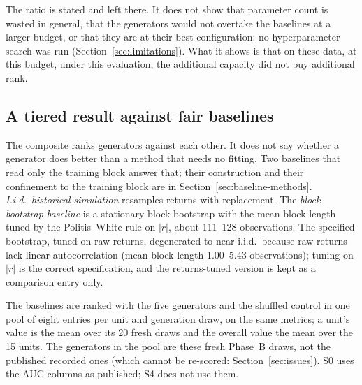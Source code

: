 \documentclass[11pt,a4paper]{article}
\makeatletter
\DeclareRobustCommand{\_}{\ifmmode\nfss@text{\textunderscore}\else\textunderscore\allowbreak\fi}
\makeatother
\begin{document}
The ratio is stated and left there. It does not show that parameter count is wasted in general, that the generators would not overtake the baselines at a larger budget, or that they are at their best configuration: no hyperparameter search was run (Section~\ref{sec:limitations}). What it shows is that on these data, at this budget, under this evaluation, the additional capacity did not buy additional rank.

\subsection{A tiered result against fair baselines}
\label{sec:tiers}
The composite ranks generators against each other. It does not say whether a generator does better than a method that needs no fitting. Two baselines that read only the training block answer that; their construction and their confinement to the training block are in Section~\ref{sec:baseline-methods}. \emph{I.i.d.\ historical simulation} resamples returns with replacement. The \emph{block-bootstrap baseline} is a stationary block bootstrap with the mean block length tuned by the Politis--White rule on $|r|$, about 111--128 observations. The specified bootstrap, tuned on raw returns, degenerated to near-i.i.d.\ because raw returns lack linear autocorrelation (mean block length 1.00--5.43 observations); tuning on $|r|$ is the correct specification, and the returns-tuned version is kept as a comparison entry only.

The baselines are ranked with the five generators and the shuffled control in one pool of eight entries per unit and generation draw, on the same metrics; a unit's value is the mean over its 20 fresh draws and the overall value the mean over the 15 units. The generators in the pool are these fresh Phase~B draws, not the published recorded ones (which cannot be re-scored: Section~\ref{sec:issues}). S0 uses the AUC columns as published; S4 does not use them.
\end{document}
